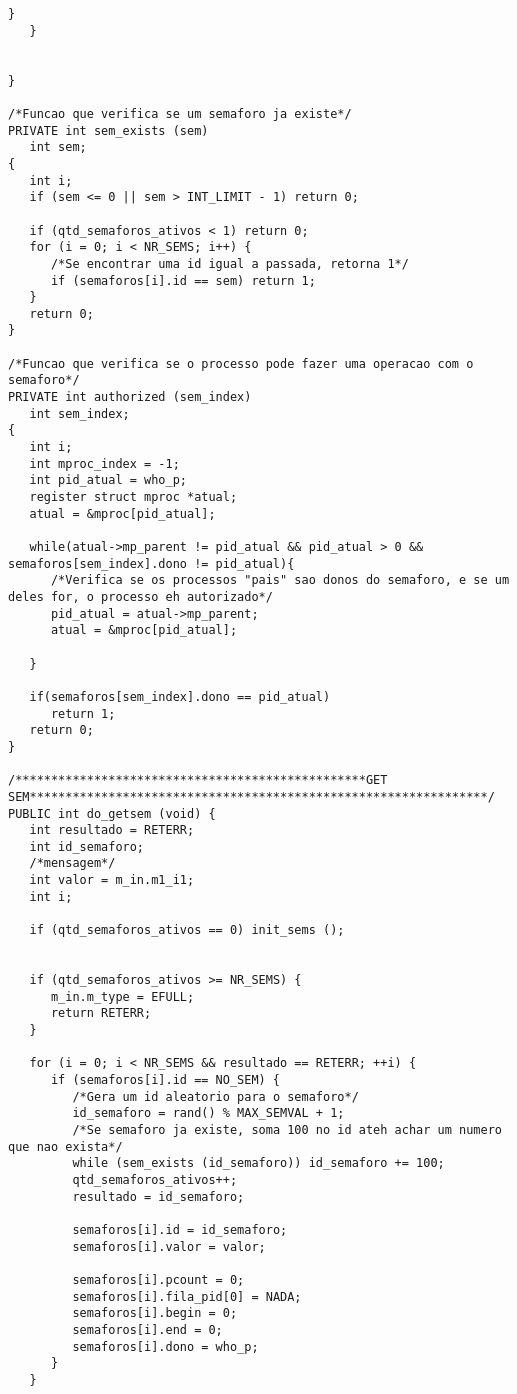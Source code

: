 \documentclass[brazil, a4paper]{scrartcl}
\begin{document}
\begin{lstlisting}[style=customc]
      }
   }

    
}

/*Funcao que verifica se um semaforo ja existe*/
PRIVATE int sem_exists (sem)
   int sem;
{
   int i;
   if (sem <= 0 || sem > INT_LIMIT - 1) return 0;

   if (qtd_semaforos_ativos < 1) return 0;
   for (i = 0; i < NR_SEMS; i++) {
      /*Se encontrar uma id igual a passada, retorna 1*/
      if (semaforos[i].id == sem) return 1;  
   }
   return 0;
}

/*Funcao que verifica se o processo pode fazer uma operacao com o semaforo*/
PRIVATE int authorized (sem_index) 
   int sem_index;
{
   int i;
   int mproc_index = -1;
   int pid_atual = who_p;
   register struct mproc *atual;
   atual = &mproc[pid_atual];
  
   while(atual->mp_parent != pid_atual && pid_atual > 0 && semaforos[sem_index].dono != pid_atual){
      /*Verifica se os processos "pais" sao donos do semaforo, e se um deles for, o processo eh autorizado*/
      pid_atual = atual->mp_parent;
      atual = &mproc[pid_atual];
      
   }

   if(semaforos[sem_index].dono == pid_atual)
      return 1;
   return 0;
}

/*************************************************GET SEM****************************************************************/
PUBLIC int do_getsem (void) {
   int resultado = RETERR;
   int id_semaforo;
   /*mensagem*/
   int valor = m_in.m1_i1;
   int i;

   if (qtd_semaforos_ativos == 0) init_sems ();


   if (qtd_semaforos_ativos >= NR_SEMS) {
      m_in.m_type = EFULL;
      return RETERR;
   }

   for (i = 0; i < NR_SEMS && resultado == RETERR; ++i) {
      if (semaforos[i].id == NO_SEM) {
         /*Gera um id aleatorio para o semaforo*/
         id_semaforo = rand() % MAX_SEMVAL + 1;
         /*Se semaforo ja existe, soma 100 no id ateh achar um numero que nao exista*/ 
         while (sem_exists (id_semaforo)) id_semaforo += 100;
         qtd_semaforos_ativos++;  
         resultado = id_semaforo;  
          
         semaforos[i].id = id_semaforo;  
         semaforos[i].valor = valor;  
          
         semaforos[i].pcount = 0;  
         semaforos[i].fila_pid[0] = NADA;  
         semaforos[i].begin = 0;
         semaforos[i].end = 0;
         semaforos[i].dono = who_p;
      }
   }
  

\end{lstlisting}
\end{document}

